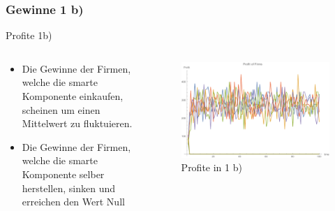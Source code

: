 \documentclass[xcolor={dvipsnames},10pt]{beamer}
\begin{document}
\subsubsection{Gewinne 1 b)}
\begin{frame}{Profite 1b)}
\begin{columns}[T]
    \begin{column}{.3\textwidth}
      \begin{itemize}
      \item Die Gewinne der Firmen, welche die smarte Komponente einkaufen,
            scheinen um einen Mittelwert zu fluktuieren.
      \item Die Gewinne der Firmen, welche die smarte Komponente selber herstellen,
            sinken und erreichen den Wert Null
      \end{itemize}
      \end{column}
      \begin{column}{.7\textwidth}
      \begin{figure}[t]
            \centering
            \includegraphics[scale=0.35]{../Plots/profit1b}
            \caption{Profite in 1 b)}
            \label{fig:profit1b}
       \end{figure}
    \end{column}
  \end{columns}
\end{frame}
\end{document}
